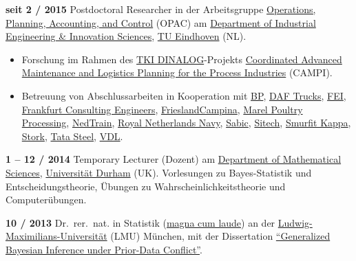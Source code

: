 \documentclass[a4paper]{simplecv}
\begin{document}
\begin{topic}
\item[\hspace*{-2ex}\bfseries seit 2 / 2015] Postdoctoral Researcher
                  in der Arbeitsgruppe \href{http://opac.ieis.tue.nl/}{\glqq Operations, Planning, Accounting, and Control\grqq} (OPAC)
                  am \href{http://www.tue.nl/en/}{Department of Industrial Engineering \& Innovation Sciences},
                  \href{http://www.tue.nl/en/}{TU Eindhoven} (NL).
\begin{itemize}
\item Forschung im Rahmen des \href{http://www.dinalog.nl/en/}{TKI DINALOG}-Projekts
\href{http://www.dinalog.nl/en/project/campi/}{\glqq Coordinated Advanced Maintenance and Logistics Planning for the Process Industries\grqq} (CAMPI).
\item Betreuung von Abschlussarbeiten in Kooperation mit
\href{http://www.bp.com/nl_nl/netherlands/over-bp/onze-raffinaderij.html}{BP},
\href{http://www.daf.com/EN}{DAF Trucks},
\href{http://www.fei.com/locations/fei-netherlands/}{FEI},
\href{http://frankfurt-consulting.de}{Frankfurt Consulting Engineers},
\href{http://www.frieslandcampina.com/en/}{FrieslandCampina},
\href{http://marel.com/poultry-processing}{Marel Poultry Processing},
\href{http://www.nedtrain.nl/}{NedTrain},
\href{http://www.defensie.nl/english/organisation/navy}{Royal Netherlands Navy},
\href{http://www.sabic.com}{Sabic},
\href{http://www.sitech.nl/en}{Sitech},
\href{http://www.smurfitkappa.com/vHome/nl/Roermond}{Smurfit Kappa},
\href{http://www.stork.com/en}{Stork},
\href{http://www.tatasteel.nl}{Tata Steel},
\href{http://www.vdlindustrialmodules.nl}{VDL}.
\end{itemize}

\item[\hspace*{-2ex}\bfseries 1 -- 12 / 2014] Temporary Lecturer (Dozent)
                  am \href{http://www.dur.ac.uk/mathematical.sciences/}{Department of Mathematical Sciences},
                  \href{http://www.durham.ac.uk}{Universität Durham} (UK).
                  Vorlesungen zu Bayes-Statistik und Entscheidungstheorie,
                  Übungen zu Wahrscheinlichkeitstheorie und Computerübungen. 

\item[\hspace*{-2ex}\bfseries 10 / 2013] Dr.\ rer.\ nat. in Statistik
                  (\href{http://www.geeeero/files/drrernat-de.pdf}{magna cum laude}) an der
                  \href{http://www.lmu.de}{Lud\-wig-Maximi\-li\-ans-Uni\-ver\-si\-tät} (LMU) München,
                  mit der Dissertation \href{https://edoc.ub.uni-muenchen.de/17059/}{``Generalized Bayesian Inference under Prior-Data Conflict''}.



\end{topic}
\end{document}
